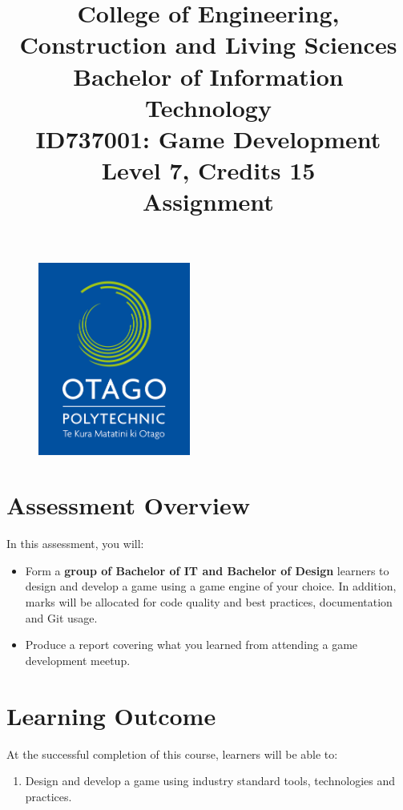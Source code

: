 \documentclass{article}
\author{}
\begin{document}
\begin{figure}
	\centering
	\includegraphics[width=50mm]{../../resources/img/logo.jpg}
\end{figure}

\title{College of Engineering, Construction and Living Sciences\\Bachelor of Information Technology\\ID737001: Game Development\\Level 7, Credits 15\\\textbf{Assignment}}
\date{}
\maketitle

\section*{Assessment Overview}
In this assessment, you will:
\begin{itemize}
	\item Form a \textbf{group of Bachelor of IT and Bachelor of Design} learners to design and develop a game using a game engine of your choice. In addition, marks will be allocated for code quality and best practices, documentation and Git usage.
	\item Produce a report covering what you learned from attending a game development meetup. 
\end{itemize}

\section*{Learning Outcome}
At the successful completion of this course, learners will be able to:
\begin{enumerate}
	\item Design and develop a game using industry standard tools, technologies and practices.
\end{enumerate}
\end{document}
